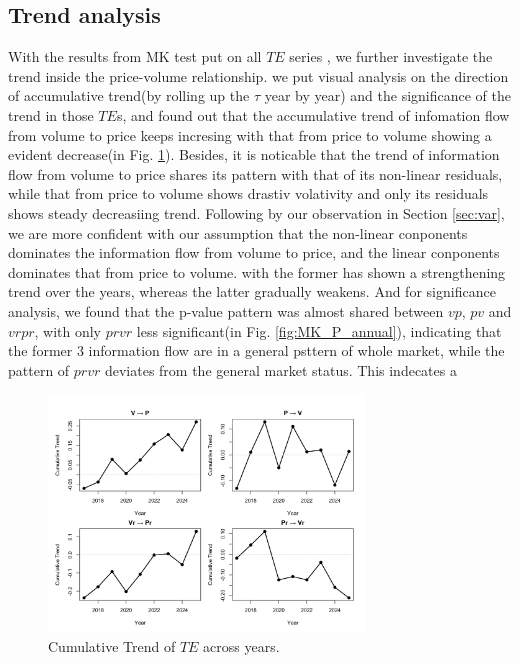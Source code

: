 \documentclass{elsarticle}
\def\rightarrow{}%
\begin{document}
\subsection{Trend analysis}
With the results from MK test put on all $TE$ series , we further investigate the trend inside the price-volume relationship. we put visual analysis on the direction of accumulative trend(by rolling up the $\tau$ year by year) and the significance of the trend in those $TE$s, and found out that the accumulative trend of infomation flow from volume to price keeps incresing with that from price to volume showing a evident decrease(in Fig. \ref{fig:MK_TAU_annual}). Besides, it is noticable that the trend of information flow from volume to price shares its pattern with that of its non-linear residuals, while that from price to volume shows drastiv volativity and only its residuals shows steady decreasiing trend. Following by our observation in Section \ref{sec:var}, we are more confident with our assumption that the non-linear conponents dominates the information flow from volume to price, and the linear conponents dominates that from price to volume. with the former has shown a strengthening trend over the years, whereas the latter gradually weakens. And for significance analysis, we found that the p-value pattern was almost shared between $v \rightarrow p$, $p \rightarrow v$ and $vr \rightarrow pr$, with only $pr \rightarrow vr$ less significant(in Fig. \ref{fig:MK_P_annual}), indicating that the former 3 information flow are in a general psttern of whole market, while the pattern of $pr \rightarrow vr$ deviates from the general market status. This indecates a 
\begin{figure}[H]
  \centering
  \includegraphics[width=0.75\textwidth]{imgs/cumulativeTrend.png}
  \caption{Cumulative Trend of $TE$ across years.}
  \label{fig:MK_TAU_annual}
  \end{figure}
\end{document}
